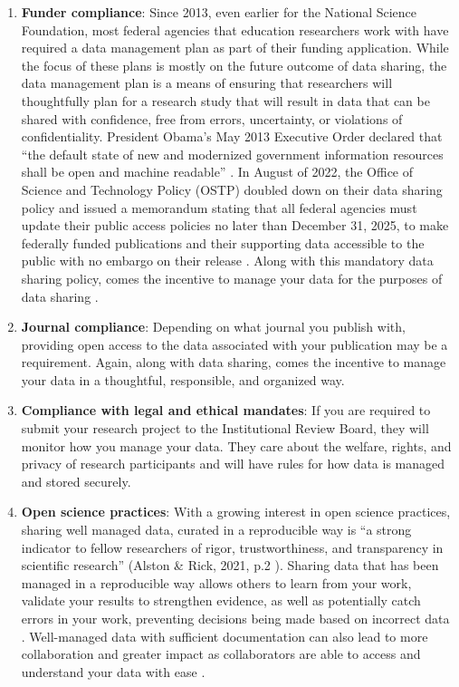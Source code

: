 \documentclass[
]{book}
\begin{document}
\begin{enumerate}
\def\labelenumi{\arabic{enumi}.}
\item
  \textbf{Funder compliance}: Since 2013, even earlier for the National Science Foundation, most federal agencies that education researchers work with have required a data management plan as part of their funding application. While the focus of these plans is mostly on the future outcome of data sharing, the data management plan is a means of ensuring that researchers will thoughtfully plan for a research study that will result in data that can be shared with confidence, free from errors, uncertainty, or violations of confidentiality. President Obama's May 2013 Executive Order declared that ``the default state of new and modernized government information resources shall be open and machine readable'' \autocite{the_white_house_executive_2013}. In August of 2022, the Office of Science and Technology Policy (OSTP) doubled down on their data sharing policy and issued a memorandum stating that all federal agencies must update their public access policies no later than December 31, 2025, to make federally funded publications and their supporting data accessible to the public with no embargo on their release \autocite{office_of_science_and_technology_policy_ostp_2022}. Along with this mandatory data sharing policy, comes the incentive to manage your data for the purposes of data sharing \autocite{borghi_promoting_2022}.
\item
  \textbf{Journal compliance}: Depending on what journal you publish with, providing open access to the data associated with your publication may be a requirement. Again, along with data sharing, comes the incentive to manage your data in a thoughtful, responsible, and organized way.
\item
  \textbf{Compliance with legal and ethical mandates}: If you are required to submit your research project to the Institutional Review Board, they will monitor how you manage your data. They care about the welfare, rights, and privacy of research participants and will have rules for how data is managed and stored securely.
\item
  \textbf{Open science practices}: With a growing interest in open science practices, sharing well managed data, curated in a reproducible way is ``a strong indicator to fellow researchers of rigor, trustworthiness, and transparency in scientific research'' (Alston \& Rick, 2021, p.2 \autocite{alston_beginners_2021}). Sharing data that has been managed in a reproducible way allows others to learn from your work, validate your results to strengthen evidence, as well as potentially catch errors in your work, preventing decisions being made based on incorrect data \autocite{alston_beginners_2021}. Well-managed data with sufficient documentation can also lead to more collaboration and greater impact as collaborators are able to access and understand your data with ease \autocites[ \textcite{eaker_what_2016}]{borghi_promoting_2022,cowles_research_nodate}.
\end{enumerate}
\end{document}
